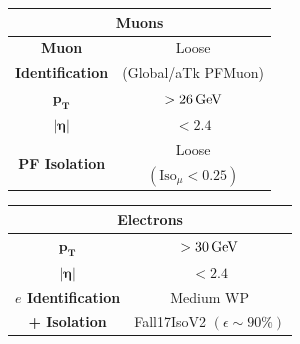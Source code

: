\begin{minipage}{\linewidth}
    \vspace{-0.5cm}
    \begin{minipage}{0.47\linewidth}
        \begin{table}[H]
        \centering
        \begin{tabular}{c|c}
            \toprule
            \multicolumn{2}{c}{\textbf{Muons}}\\
            \midrule
            \midrule
            \textbf{Muon} & Loose\\
            \textbf{Identification}& (Global/aTk PFMuon)\\
            \midrule
            $\mathbf{p_T}$& $>26 {\,\text{Ge\hspace{-.08em}V}}$\\
            \midrule
            $\bm{|\eta|}$& $<2.4$ \\
            \midrule
            \multirow{2}{*}{\textbf{PF Isolation}}&Loose\\
            &$(\text{Iso}_\mu<0.25)$\\
            \bottomrule
        \end{tabular}
    \end{table}
        
    \end{minipage}
    \hfill
    \begin{minipage}{0.47\linewidth}
        \begin{table}[H]
            \centering
            \renewcommand{\arraystretch}{1.48}
            \begin{tabular}{c|c}
                \toprule
                \multicolumn{2}{c}{\textbf{Electrons}}\\
                \midrule
                \midrule
                $\mathbf{p_T}$& $>30 {\,\text{Ge\hspace{-.08em}V}}$\\
                \midrule
                $\bm{|\eta|}$& $<2.4$ \\
                \midrule
                \textbf{$e$ Identification}&Medium WP\\
                \textbf{+ Isolation}&Fall17IsoV2 $(\epsilon \sim 90\%)$\\
                \bottomrule
            \end{tabular}
        \end{table}      
    \end{minipage}
\end{minipage}


